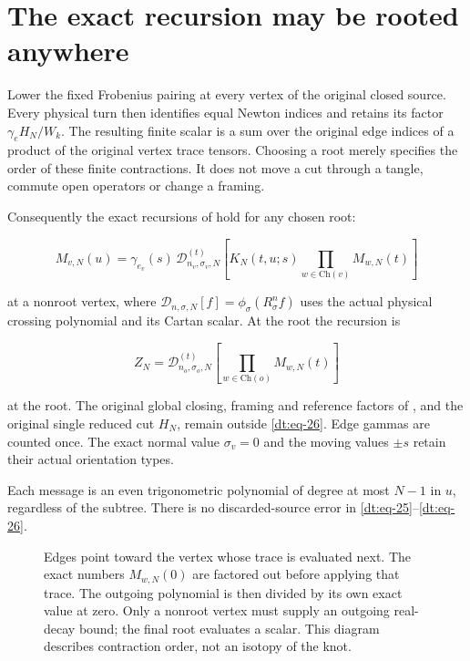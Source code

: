 \section{The exact recursion may be rooted anywhere}\label{dt:sec-3}

Lower the fixed Frobenius pairing at every vertex of the original closed
source. Every physical turn then identifies equal Newton indices and
retains its factor \(\gamma_e H_N/W_k\). The resulting finite scalar is a
sum over the original edge indices of a product of the original vertex
trace tensors. Choosing a root merely specifies the order of these
finite contractions. It does not move a cut through a tangle, commute
open operators or change a framing.

Consequently the exact recursions of \cite[Theorem~7.1]{Meridian} hold for any chosen root:

\begin{equation}\label{dt:eq-25}
M_{v,N}(u)=\gamma_{e_v}(s)\,
 \mathcal D_{n_v,\sigma_v,N}^{(t)}
 \left[K_N(t,u;s)\prod_{w\in\mathrm{Ch}(v)}M_{w,N}(t)\right]
\end{equation}

at a nonroot vertex, where
\(\mathcal D_{n,\sigma,N}[f]=\phi_\sigma(R_\sigma^n f)\)
uses the actual physical crossing polynomial and its Cartan scalar.
At the root the recursion is

\begin{equation}\label{dt:eq-26}
Z_N=\mathcal D_{n_o,\sigma_o,N}^{(t)}
                  \left[\prod_{w\in\mathrm{Ch}(o)}M_{w,N}(t)\right]
\end{equation}

at the root. The original global closing, framing and reference factors of \cite[Proposition~8.1]{Meridian},
and the original single reduced cut \(H_N\), remain outside \eqref{dt:eq-26}. Edge
gammas are counted once. The exact normal value \(\sigma_v=0\) and the moving
values \(\pm s\) retain their actual orientation types.

Each message is an even trigonometric polynomial of degree at most \(N-1\)
in \(u\), regardless of the subtree. There is no discarded-source error in
\eqref{dt:eq-25}--\eqref{dt:eq-26}.

\begin{figure}[t]
\centering
\caption{Edges point toward the vertex whose trace is evaluated next.
The exact numbers \(M_{w,N}(0)\) are factored out before applying that
trace. The outgoing polynomial is then divided by its own exact value
at zero. Only a nonroot vertex must supply an outgoing real-decay bound;
the final root evaluates a scalar. This diagram describes contraction
order, not an isotopy of the knot.}\label{dt:recursion-figure}
\end{figure}

